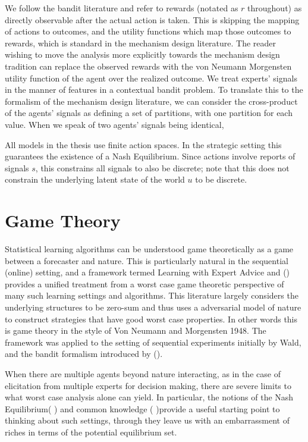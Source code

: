 We follow the bandit literature and refer to rewards (notated as $r$ throughout) as directly observable after the actual action is taken. This is skipping the mapping of actions to outcomes, and the utility functions which map those outcomes to rewards, which is standard in the mechanism design literature. The reader wishing to move the analysis more explicitly towards the mechanism design tradition can replace the observed rewards with the von Neumann Morgensten utility function of the agent over the realized outcome.
We treat experts' signals in the manner of features in a contextual bandit problem. To translate this to the formalism of the mechanism design literature, we can consider the cross-product of the agents' signals as defining a set of partitions, with one partition for each value. 
When we speak of two agents' signals being identical, 


All models in the thesis use finite action spaces. 
In the strategic setting this guarantees the existence of a Nash Equilibrium. 
Since actions involve reports of signals $s$, this constrains all signals to also be discrete; note that this does not constrain the underlying latent state of the world $u$ to be discrete.


\section{Game Theory}

Statistical learning algorithms can be understood game theoretically as a game between a forecaster and nature. This is particularly natural in the sequential (online) setting, and a framework termed Learning with Expert Advice and (\cite{cesa2006prediction}) provides a unified treatment from a worst case game theoretic perspective of many such learning settings and algorithms.
This literature largely considers the underlying structures to be zero-sum and thus uses a adversarial model of nature to construct strategies that have good worst case properties. In other words this is game theory in the style of Von Neumann and Morgensten 1948. The framework was applied to the setting of sequential experiments initially by Wald, and the bandit formalism introduced by (\cite{robbins1952some}).

When there are multiple agents beyond nature interacting, as in the case of elicitation from multiple experts for decision making, there are severe limits to what worst case analysis alone can yield. 
In particular, the notions of the Nash Equilibrium( \cite{nash1950equilibrium}) and common knowledge (\cite{aumann1976agreeing} )provide a useful starting point to thinking about such settings, through they leave us with an embarrassment of riches in terms of the potential equilibrium set.



